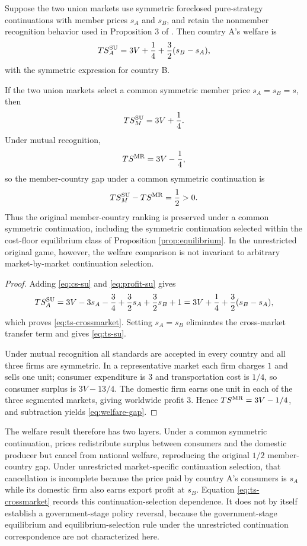 \begin{proposition}\label{prop:welfare}
Suppose the two union markets use symmetric foreclosed pure-strategy continuations with member prices $s_A$ and $s_B$, and retain the nonmember recognition behavior used in Proposition 3 of \citet{gandalshy2001}. Then country A's welfare is
\begin{equation}\label{eq:ts-crossmarket}
 TS_A^{\mathrm{SU}}
 =3V+\frac14+\frac32(s_B-s_A),
\end{equation}
with the symmetric expression for country B.

If the two union markets select a common symmetric member price $s_A=s_B=s$, then
\begin{equation}\label{eq:ts-su}
 TS_M^{\mathrm{SU}}=3V+\frac14.
\end{equation}
Under mutual recognition,
\begin{equation}\label{eq:ts-mr}
 TS^{\mathrm{MR}}=3V-\frac14,
\end{equation}
so the member-country gap under a common symmetric continuation is
\begin{equation}\label{eq:welfare-gap}
 TS_M^{\mathrm{SU}}-TS^{\mathrm{MR}}=\frac12>0.
\end{equation}
Thus the original member-country ranking is preserved under a common symmetric continuation, including the symmetric continuation selected within the cost-floor equilibrium class of Proposition \ref{prop:equilibrium}. In the unrestricted original game, however, the welfare comparison is not invariant to arbitrary market-by-market continuation selection.
\end{proposition}

\begin{proof}
Adding \eqref{eq:cs-su} and \eqref{eq:profit-su} gives
\[
 TS_A^{\mathrm{SU}}
 =3V-3s_A-\frac34+\frac32s_A+\frac32s_B+1
 =3V+\frac14+\frac32(s_B-s_A),
\]
which proves \eqref{eq:ts-crossmarket}. Setting $s_A=s_B$ eliminates the cross-market transfer term and gives \eqref{eq:ts-su}.

Under mutual recognition all standards are accepted in every country and all three firms are symmetric. In a representative market each firm charges $1$ and sells one unit; consumer expenditure is $3$ and transportation cost is $1/4$, so consumer surplus is $3V-13/4$. The domestic firm earns one unit in each of the three segmented markets, giving worldwide profit $3$. Hence $TS^{\mathrm{MR}}=3V-1/4$, and subtraction yields \eqref{eq:welfare-gap}.
\end{proof}

The welfare result therefore has two layers. Under a common symmetric continuation, prices redistribute surplus between consumers and the domestic producer but cancel from national welfare, reproducing the original $1/2$ member-country gap. Under unrestricted market-specific continuation selection, that cancellation is incomplete because the price paid by country A's consumers is $s_A$ while its domestic firm also earns export profit at $s_B$. Equation \eqref{eq:ts-crossmarket} records this continuation-selection dependence. It does not by itself establish a government-stage policy reversal, because the government-stage equilibrium and equilibrium-selection rule under the unrestricted continuation correspondence are not characterized here.

